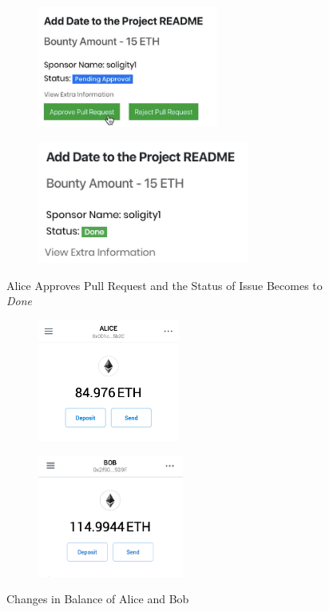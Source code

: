 \documentclass[12pt]{article}
\renewcommand{\_}{\kern-1.5pt\textunderscore\kern-1.5pt}
\begin{document}
\begin{figure}[H]
	\centering
	\begin{subfigure}[b]{.45\textwidth}
		\centering
		\includegraphics[height=4cm]{graphs/40. alice_approve_pull_request}
	\end{subfigure}
	\begin{subfigure}[b]{.45\textwidth}
		\centering
		\includegraphics[height=4cm]{graphs/41. issue_status_done}
	\end{subfigure}
	\caption{Alice Approves Pull Request and the Status of Issue Becomes to \textit{Done}}
\end{figure}

\begin{figure}[H]
	\centering
	\begin{subfigure}[b]{.45\textwidth}
		\centering
		\includegraphics[height=4cm]{graphs/42. metamask_alice_balance}
	\end{subfigure}
	\begin{subfigure}[b]{.45\textwidth}
		\centering
		\includegraphics[height=4cm]{graphs/43. metamask_bob_balance}
	\end{subfigure}
	\caption{Changes in Balance of Alice and Bob}
\end{figure}
\end{document}
